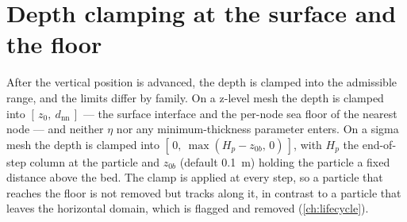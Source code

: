 \section{Depth clamping at the surface and the floor}\label{sec:vert-clamp}

After the vertical position is advanced, the depth is clamped into the admissible range, and the
limits differ by family. On a z-level mesh the depth is clamped into $[\,z_0,\ d_{\text{nn}}\,]$ --- the
surface interface and the per-node sea floor of the nearest node --- and neither $\eta$ nor any
minimum-thickness parameter enters. On a sigma mesh the depth is clamped into
$[\,0,\ \max(H_p-z_{0b},\,0)\,]$, with $H_p$ the end-of-step column at the particle and $z_{0b}$ (default
\SI{0.1}{\metre}) holding the particle a fixed distance above the bed. The clamp is applied at every
step, so a particle that reaches the floor is not removed but tracks along it, in contrast to a particle
that leaves the horizontal domain, which is flagged and removed (\cref{ch:lifecycle}).


